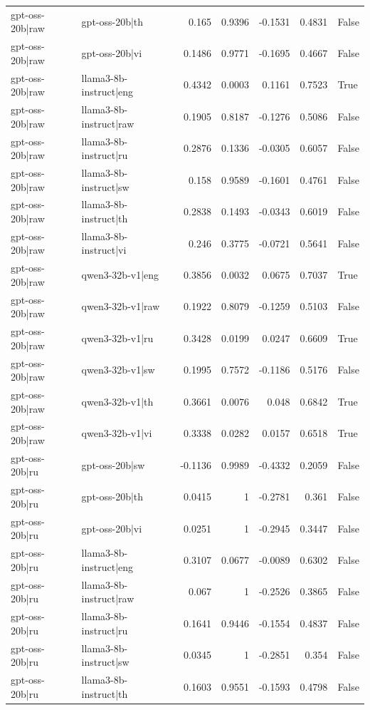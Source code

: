 \begin{table}
\begin{tabular}{l l r r r r l}
gpt-oss-20b|raw & gpt-oss-20b|th & 0.165 & 0.9396 & -0.1531 & 0.4831 & False \\
gpt-oss-20b|raw & gpt-oss-20b|vi & 0.1486 & 0.9771 & -0.1695 & 0.4667 & False \\
gpt-oss-20b|raw & llama3-8b-instruct|eng & 0.4342 & 0.0003 & 0.1161 & 0.7523 & True \\
gpt-oss-20b|raw & llama3-8b-instruct|raw & 0.1905 & 0.8187 & -0.1276 & 0.5086 & False \\
gpt-oss-20b|raw & llama3-8b-instruct|ru & 0.2876 & 0.1336 & -0.0305 & 0.6057 & False \\
gpt-oss-20b|raw & llama3-8b-instruct|sw & 0.158 & 0.9589 & -0.1601 & 0.4761 & False \\
gpt-oss-20b|raw & llama3-8b-instruct|th & 0.2838 & 0.1493 & -0.0343 & 0.6019 & False \\
gpt-oss-20b|raw & llama3-8b-instruct|vi & 0.246 & 0.3775 & -0.0721 & 0.5641 & False \\
gpt-oss-20b|raw & qwen3-32b-v1|eng & 0.3856 & 0.0032 & 0.0675 & 0.7037 & True \\
gpt-oss-20b|raw & qwen3-32b-v1|raw & 0.1922 & 0.8079 & -0.1259 & 0.5103 & False \\
gpt-oss-20b|raw & qwen3-32b-v1|ru & 0.3428 & 0.0199 & 0.0247 & 0.6609 & True \\
gpt-oss-20b|raw & qwen3-32b-v1|sw & 0.1995 & 0.7572 & -0.1186 & 0.5176 & False \\
gpt-oss-20b|raw & qwen3-32b-v1|th & 0.3661 & 0.0076 & 0.048 & 0.6842 & True \\
gpt-oss-20b|raw & qwen3-32b-v1|vi & 0.3338 & 0.0282 & 0.0157 & 0.6518 & True \\
gpt-oss-20b|ru & gpt-oss-20b|sw & -0.1136 & 0.9989 & -0.4332 & 0.2059 & False \\
gpt-oss-20b|ru & gpt-oss-20b|th & 0.0415 & 1 & -0.2781 & 0.361 & False \\
gpt-oss-20b|ru & gpt-oss-20b|vi & 0.0251 & 1 & -0.2945 & 0.3447 & False \\
gpt-oss-20b|ru & llama3-8b-instruct|eng & 0.3107 & 0.0677 & -0.0089 & 0.6302 & False \\
gpt-oss-20b|ru & llama3-8b-instruct|raw & 0.067 & 1 & -0.2526 & 0.3865 & False \\
gpt-oss-20b|ru & llama3-8b-instruct|ru & 0.1641 & 0.9446 & -0.1554 & 0.4837 & False \\
gpt-oss-20b|ru & llama3-8b-instruct|sw & 0.0345 & 1 & -0.2851 & 0.354 & False \\
gpt-oss-20b|ru & llama3-8b-instruct|th & 0.1603 & 0.9551 & -0.1593 & 0.4798 & False \\

\end{tabular}
\end{table}
